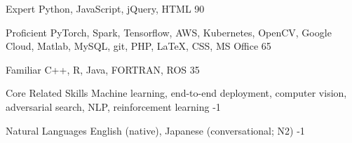 



\begin{cvskills}


  \cvskill
    {Expert} %
    {Python, JavaScript, jQuery, HTML}
    {90}

  \cvskill
    {Proficient} %
    {PyTorch, Spark, Tensorflow, AWS, Kubernetes, OpenCV, Google Cloud, Matlab, MySQL, git, PHP, LaTeX, CSS, MS Office}
    {65}

  \cvskill
    {Familiar} %
    {C++, R, Java, FORTRAN, ROS}
    {35}


\end{cvskills}




\begin{cvskills}

  \cvskill
    {Core Related Skills} %
    {Machine learning, end-to-end deployment, computer vision, adversarial search, NLP, reinforcement learning}
    {-1}

  \cvskill
    {Natural Languages} %
    {English (native), Japanese (conversational; N2)} %
    {-1}

\end{cvskills}